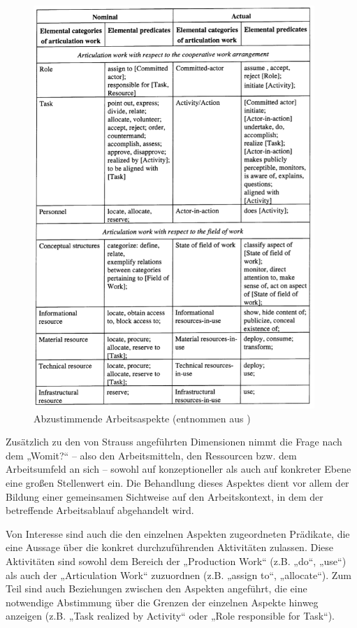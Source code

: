 \begin{figure}[htbp]
	\centering
	\includegraphics[height=6in]{img/ArticulationWork/schmidt96-articulation-categories.png}
	\caption[Abzustimmende Arbeitsaspekte]{Abzustimmende Arbeitsaspekte (entnommen aus \citep{Schmidt96})}
	\label{fig:img_ArticulationWork_schmidt96-articulation-categories}
\end{figure}

Zusätzlich zu den von Strauss angeführten Dimensionen nimmt die Frage nach dem „Womit?“ -- also den Arbeitsmitteln, den Ressourcen bzw. dem Arbeitsumfeld an sich -- sowohl auf konzeptioneller als auch auf konkreter Ebene eine großen Stellenwert ein. Die Behandlung dieses Aspektes dient vor allem der Bildung einer gemeinsamen Sichtweise auf den Arbeitskontext, in dem der betreffende Arbeitsablauf abgehandelt wird.

Von Interesse sind auch die den einzelnen Aspekten zugeordneten Prädikate, die eine Aussage über die konkret durchzuführenden Aktivitäten zulassen. Diese Aktivitäten sind sowohl dem Bereich der „Production Work“ (z.B. „do“, „use“) als auch der „Articulation Work“ zuzuordnen (z.B. „assign to“, „allocate“). Zum Teil sind auch Beziehungen zwischen den Aspekten angeführt, die eine notwendige Abstimmung über die Grenzen der einzelnen Aspekte hinweg anzeigen (z.B. „Task realized by Activity“ oder „Role responsible for Task“).

